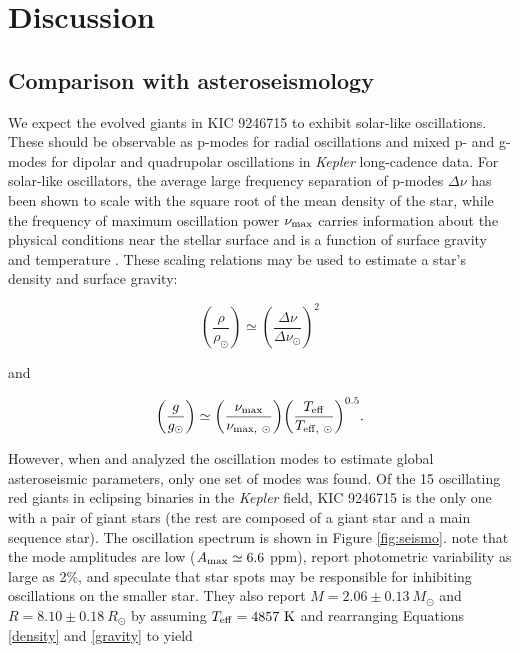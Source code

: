 \section{Discussion}\label{discuss}

\subsection{Comparison with asteroseismology}\label{seismo}

We expect the evolved giants in KIC 9246715 to exhibit solar-like oscillations. These should be observable as p-modes for radial oscillations and mixed p- and g- modes for dipolar and quadrupolar oscillations in \emph{Kepler} long-cadence data. For solar-like oscillators, the average large frequency separation of p-modes $\Delta \nu$ has been shown to scale with the square root of the mean density of the star, while the frequency of maximum oscillation power $\nu_{\rm{max}}$ carries information about the physical conditions near the stellar surface and is a function of surface gravity and temperature \citep{cha13}. These scaling relations may be used to estimate a star's density and surface gravity:

\begin{equation} \label{density}
{\left( \frac{\rho}{\rho_{\odot}} \right)} \simeq {\left( \frac{\Delta \nu}{\Delta \nu_{\odot}} \right)}^{2}
\end{equation}

and

\begin{equation} \label{gravity}
{\left( \frac{g}{g_{\odot}} \right)} \simeq {\left( \frac{\nu_{\rm{max}}}{\nu_{\rm{max}, \ \odot}} \right)} {\left( \frac{T_{\rm{eff}}}{T_{\rm{eff}, \ \odot}} \right)}^{0.5}.
\end{equation}

However, when \citet{gau13} and \citet{gau14} analyzed the oscillation modes to estimate global asteroseismic parameters, only one set of modes was found. Of the 15 oscillating red giants in eclipsing binaries in the \emph{Kepler} field, KIC 9246715 is the only one with a pair of giant stars (the rest are composed of a giant star and a main sequence star). The oscillation spectrum is shown in Figure \ref{fig:seismo}. \citet{gau14} note that the mode amplitudes are low ($A_{\rm{max}} \simeq 6.6$ ppm), report photometric variability as large as 2\%, and speculate that star spots may be responsible for inhibiting oscillations on the smaller star. They also report $M = 2.06 \pm 0.13 \ M_{\odot}$ and $R = 8.10 \pm 0.18 \ R_{\odot}$ by assuming $T_{\rm{eff}} = 4857 \ \rm{K}$ and rearranging Equations \ref{density} and \ref{gravity} to yield

